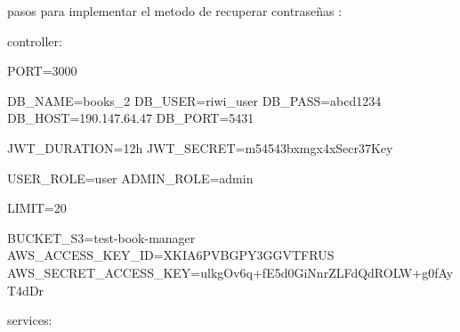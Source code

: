 pasos para implementar el metodo de recuperar contraseñas :

controller:










PORT=3000

DB_NAME=books_2
DB_USER=riwi_user
DB_PASS=abcd1234
DB_HOST=190.147.64.47
DB_PORT=5431

JWT_DURATION=12h
JWT_SECRET=m54543bxmgx4xSecr37Key

USER_ROLE=user
ADMIN_ROLE=admin

LIMIT=20

BUCKET_S3=test-book-manager
AWS_ACCESS_KEY_ID=XKIA6PVBGPY3GGVTFRUS
AWS_SECRET_ACCESS_KEY=ulkgOv6q+fE5d0GiNnrZLFdQdROLW+g0fAyT4dDr

services:



